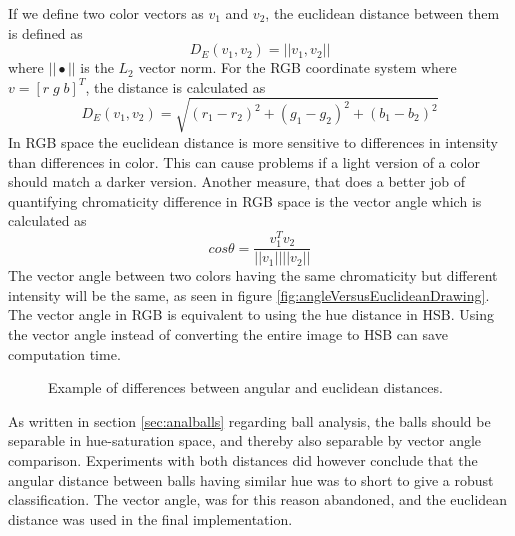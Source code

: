If we define two color vectors as $v_{1}$ and $v_{2}$, the euclidean distance between them is defined as
\begin{equation}
D_{E}(v_{1}, v_{2}) = ||v_{1}, v_{2}||
\end{equation}
where $||\bullet||$ is the $L_{2}$ vector norm. For the RGB coordinate system where $v = [r\;g\;b]^{T}$, the distance is calculated as
\begin{equation}
D_{E}(v_{1}, v_{2}) = \sqrt{(r_{1} - r_{2})^{2} + (g_{1} - g_{2})^{2} + (b_{1} - b_{2})^{2}}
\end{equation}
In RGB space the euclidean distance is more sensitive to differences in intensity than differences in color. This can cause problems if a light version of a color should match a darker version. Another measure, that does a better job of quantifying chromaticity difference in RGB space is the vector angle which is calculated as
\begin{equation}
cos \theta = \frac{v_{1}^ Tv_{2}}{||v_{1}|| ||v_{2}||}
\end{equation}
The vector angle between two colors having the same chromaticity but different intensity will be the same, as seen in figure \ref{fig:angleVersusEuclideanDrawing}. The vector angle in RGB is equivalent to using the hue distance in HSB. Using the vector angle instead of converting the entire image to HSB can save computation time.\cite{angleVsEuclidean}
\begin{figure}[H]
  \centering
  \quad           
\caption{Example of differences between angular and euclidean distances.}
\label{fig:angleVersusEuclidean}
\end{figure}
As written in section \ref{sec:analballs} regarding ball analysis, the balls should be separable in hue-saturation space, and thereby also separable by vector angle comparison. Experiments with both distances did however conclude that the angular distance between balls having similar hue was to short to give a robust classification. The vector angle, was for this reason abandoned, and the euclidean distance was used in the final implementation.

